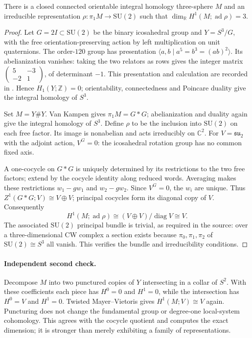 \begin{proposition}
There is a closed connected orientable integral homology
three-sphere \(M\) and an irreducible representation
\(\rho:\pi_1M\to\mathrm{SU}(2)\) such that
\(\dim_{\mathbb R}H^1(M;\operatorname{ad}\rho)=3\).
\end{proposition}
\begin{proof}
Let \(G=2I\subset\mathrm{SU}(2)\) be the binary icosahedral group
and \(Y=S^3/G\), with the free orientation-preserving action by
left multiplication on unit quaternions.
The order-\(120\) group has presentation
\(\langle a,b\mid a^5=b^3=(ab)^2\rangle\).
Its abelianization vanishes: taking the two relators as rows gives the integer
matrix \(\left(\begin{smallmatrix}5&-3\\-2&1\end{smallmatrix}\right)\),
of determinant \(-1\).
This presentation and calculation are recorded in
\citet[Example~2.38]{hatcher2002algebraic}.
Hence \(H_1(Y;\mathbb Z)=0\); orientability, connectedness and
Poincare duality give the integral homology of \(S^3\).

Set \(M=Y\#Y\). Van Kampen gives \(\pi_1M=G*G\);
abelianization and duality again give the integral homology of \(S^3\).
Define \(\rho\) to be the inclusion into \(\mathrm{SU}(2)\) on each
free factor. Its image is nonabelian and acts irreducibly on
\(\mathbb C^2\). For \(V=\mathfrak{su}_2\) with the adjoint action,
\(V^G=0\): the icosahedral rotation group has no common fixed axis.

A one-cocycle on \(G*G\) is uniquely determined by its restrictions
to the two free factors; extend by the cocycle identity along reduced
words. Averaging makes these restrictions
\(w_1-gw_1\) and \(w_2-gw_2\).
Since \(V^G=0\), the \(w_i\) are unique. Thus
\(Z^1(G*G;V)\cong V\oplus V\); principal cocycles form its diagonal
copy of \(V\). Consequently
\[
 H^1(M;\operatorname{ad}\rho)\cong
 (V\oplus V)/\operatorname{diag}V\cong V.
\]
The associated \(\mathrm{SU}(2)\) principal bundle is trivial, as
required in the source: over a three-dimensional CW complex a section
exists because \(\pi_0,\pi_1,\pi_2\) of \(\mathrm{SU}(2)\cong S^3\)
all vanish. This verifies the bundle and irreducibility conditions.
\end{proof}

\paragraph{Independent second check.}
Decompose \(M\) into two punctured copies of \(Y\) intersecting
in a collar of \(S^2\). With these coefficients each piece has
\(H^0=0\) and \(H^1=0\), while the intersection has \(H^0=V\)
and \(H^1=0\). Twisted Mayer--Vietoris gives
\(H^1(M;V)\cong V\) again. Puncturing does not change the
fundamental group or degree-one local-system cohomology.
This agrees with the cocycle quotient and computes the exact dimension;
it is stronger than merely exhibiting a family of representations.
